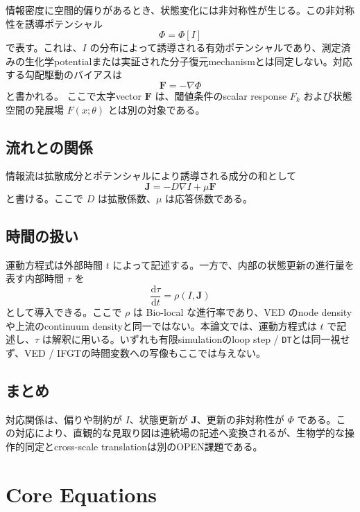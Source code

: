 \documentclass[11pt]{ltjsarticle}
\newcommand{\I}{I}
\newcommand{\J}{\mathbf{J}}
\newcommand{\PhiI}{\Phi}
\newcommand{\dd}{\mathrm{d}}
\begin{document}
情報密度に空間的偏りがあるとき、状態変化には非対称性が生じる。この非対称性を誘導ポテンシャル
\begin{equation}
  \PhiI = \PhiI[\I]
\end{equation}
で表す。これは、\(\I\) の分布によって誘導される有効ポテンシャルであり、測定済みの生化学potentialまたは実証された分子復元mechanismとは同定しない。対応する勾配駆動のバイアスは
\begin{equation}
  \mathbf{F}=-\nabla \PhiI
\end{equation}
と書かれる。
ここで太字vector \(\mathbf{F}\) は、閾値条件のscalar response \(F_k\) および状態空間の発展場 \(F(x;\theta)\) とは別の対象である。

\subsection{流れとの関係}

情報流は拡散成分とポテンシャルにより誘導される成分の和として
\begin{equation}
  \J = -D\nabla \I + \mu \mathbf{F}
\end{equation}
と書ける。ここで \(D\) は拡散係数、\(\mu\) は応答係数である。

\subsection{時間の扱い}

運動方程式は外部時間 \(t\) によって記述する。一方で、内部の状態更新の進行量を表す内部時間 \(\tau\) を
\begin{equation}
  \frac{\dd \tau}{\dd t}=\rho(\I,\J)
\end{equation}
として導入できる。ここで \(\rho\) は Bio-local な進行率であり、VED のnode densityや上流のcontinuum densityと同一ではない。本論文では、運動方程式は \(t\) で記述し、\(\tau\) は解釈に用いる。いずれも有限simulationのloop step / \texttt{DT}とは同一視せず、VED / IFGTの時間変数への写像もここでは与えない。

\subsection{まとめ}

対応関係は、偏りや制約が \(\I\)、状態更新が \(\J\)、更新の非対称性が \(\PhiI\) である。この対応により、直観的な見取り図は連続場の記述へ変換されるが、生物学的な操作的同定とcross-scale translationは別のOPEN課題である。

\section{Core Equations}
\end{document}
